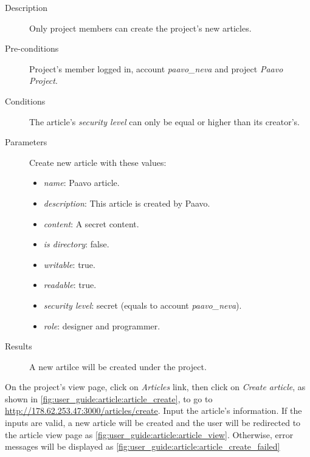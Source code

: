 \begin{description}
\item[Description] Only project members can create the project's new articles.
\item[Pre-conditions] Project's member logged in, \eg account \emph{paavo\_neva} and project \emph{Paavo Project}.
\item[Conditions] The article's \emph{security level} can only be equal or higher than its creator's.
\item[Parameters] Create new article with these values:
\begin{itemize}
\item \emph{name}: Paavo article.
\item \emph{description}: This article is created by Paavo.
\item \emph{content}: A secret content.
\item \emph{is directory}: false.
\item \emph{writable}: true.
\item \emph{readable}: true.
\item \emph{security level}: secret (equals to account \emph{paavo\_neva}).
\item \emph{role}: designer and programmer.
\end{itemize}
\item[Results] A new artilce will be created under the project.
\end{description}

On the project's view page, click on \emph{Articles} link, then click on \emph{Create article}, as shown in \autoref{fig:user_guide:article:article_create}, to go to \href{http://178.62.253.47:3000/articles/create}{http://178.62.253.47:3000/articles/create}.
Input the article's information.
If the inputs are valid, a new article will be created and the user will be redirected to the article view page as \autoref{fig:user_guide:article:article_view}.
Otherwise, error messages will be displayed as \autoref{fig:user_guide:article:article_create_failed}

